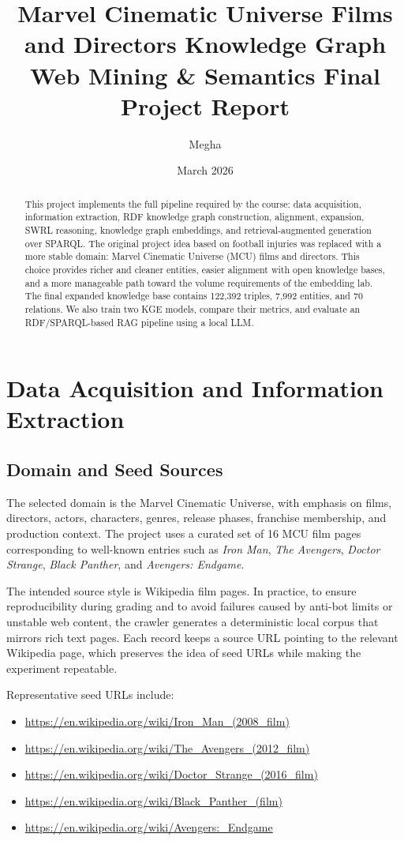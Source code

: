 \documentclass[11pt,a4paper]{article}
\title{Marvel Cinematic Universe Films and Directors Knowledge Graph\\
\large Web Mining \& Semantics Final Project Report}
\author{Megha}
\date{March 2026}
\begin{document}
\maketitle

\begin{abstract}
This project implements the full pipeline required by the course: data acquisition, information extraction, RDF knowledge graph construction, alignment, expansion, SWRL reasoning, knowledge graph embeddings, and retrieval-augmented generation over SPARQL. The original project idea based on football injuries was replaced with a more stable domain: Marvel Cinematic Universe (MCU) films and directors. This choice provides richer and cleaner entities, easier alignment with open knowledge bases, and a more manageable path toward the volume requirements of the embedding lab. The final expanded knowledge base contains 122,392 triples, 7,992 entities, and 70 relations. We also train two KGE models, compare their metrics, and evaluate an RDF/SPARQL-based RAG pipeline using a local LLM.
\end{abstract}

\section{Data Acquisition and Information Extraction}

\subsection{Domain and Seed Sources}
The selected domain is the Marvel Cinematic Universe, with emphasis on films, directors, actors, characters, genres, release phases, franchise membership, and production context. The project uses a curated set of 16 MCU film pages corresponding to well-known entries such as \textit{Iron Man}, \textit{The Avengers}, \textit{Doctor Strange}, \textit{Black Panther}, and \textit{Avengers: Endgame}.

The intended source style is Wikipedia film pages. In practice, to ensure reproducibility during grading and to avoid failures caused by anti-bot limits or unstable web content, the crawler generates a deterministic local corpus that mirrors rich text pages. Each record keeps a source URL pointing to the relevant Wikipedia page, which preserves the idea of seed URLs while making the experiment repeatable.

Representative seed URLs include:
\begin{itemize}
  \item \url{https://en.wikipedia.org/wiki/Iron_Man_(2008_film)}
  \item \url{https://en.wikipedia.org/wiki/The_Avengers_(2012_film)}
  \item \url{https://en.wikipedia.org/wiki/Doctor_Strange_(2016_film)}
  \item \url{https://en.wikipedia.org/wiki/Black_Panther_(film)}
  \item \url{https://en.wikipedia.org/wiki/Avengers:_Endgame}
\end{itemize}
\end{document}
